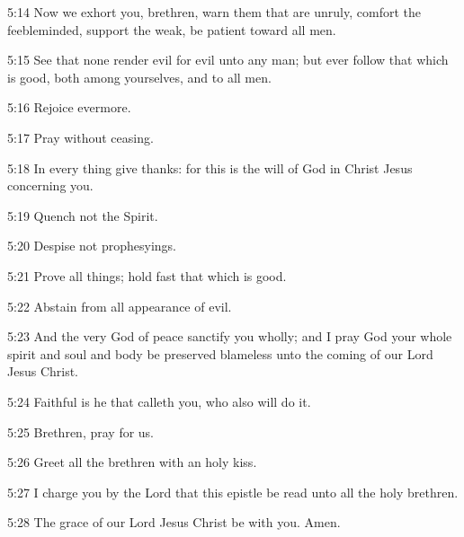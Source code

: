 5:14 Now we exhort you, brethren, warn them that are unruly, comfort the feebleminded, support the weak, be patient toward all men.

5:15 See that none render evil for evil unto any man; but ever follow that which is good, both among yourselves, and to all men.

5:16 Rejoice evermore.

5:17 Pray without ceasing.

5:18 In every thing give thanks: for this is the will of God in Christ Jesus concerning you.

5:19 Quench not the Spirit.

5:20 Despise not prophesyings.

5:21 Prove all things; hold fast that which is good.

5:22 Abstain from all appearance of evil.

5:23 And the very God of peace sanctify you wholly; and I pray God your whole spirit and soul and body be preserved blameless unto the coming of our Lord Jesus Christ.

5:24 Faithful is he that calleth you, who also will do it.

5:25 Brethren, pray for us.

5:26 Greet all the brethren with an holy kiss.

5:27 I charge you by the Lord that this epistle be read unto all the holy brethren.

5:28 The grace of our Lord Jesus Christ be with you. Amen.

